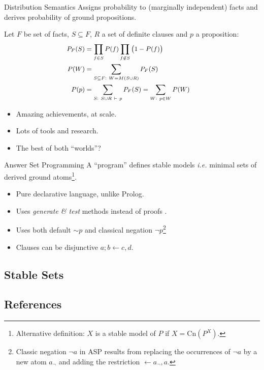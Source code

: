 \documentclass[bigger]{beamer}
\begin{document}
    \begin{frame}{Distribution Semantics}
        Assigns probability to (marginally independent) facts and derives probability of ground propositions.

        Let $F$ be set of facts, $S\subseteq F$, $R$ a set of definite clauses and $p$ a proposition:
        $$\small
        \begin{aligned}
            P_F(S) &= \prod_{f \in S} P(f) \prod_{f \not\in S} \left(1 - P(f) \right) \cr
            P(W) &= \sum_{S \subseteq F :~W=M(S\cup R)} P_F(S) \cr
            P(p) &= \sum_{S :~ S\cup R ~\vdash~ p} P_F(S) = \sum_{W :~ p\in W} P(W)
        \end{aligned}
        $$
        \begin{itemize}
            \item Amazing achievements, at scale.
            \item Lots of tools and research.
            \item The best of both ``worlds''?
        \end{itemize}
        
    \end{frame}

    \begin{frame}{Answer Set Programming}
        A ``program'' defines stable models \emph{i.e.} minimal sets of derived ground atoms\footnote{Alternative  definition: $X$ is a stable model of $P$ if $X = \text{Cn}(P^X)$.}.  
        \begin{itemize}
            \item Pure declarative language, unlike Prolog.
            \item Uses \emph{generate \& test} methods instead of proofs .
            \item Uses both default $\sim\!p$ and classical negation $\neg p$\footnote{Classic negation $\neg a$ in ASP results from replacing the occurrences of $\neg a$ by a new atom $a_\neg$ and adding the restriction $\leftarrow a_\neg, a$.}
            \item Clauses can be disjunctive $a ; b \leftarrow c, d.$
        \end{itemize}
    \end{frame}

    \subsection*{Stable Sets}
    
    \begin{frame}
        \tableofcontents[currentsection]
    \end{frame}

    \subsection*{References}
    
    \begin{frame}
        \tableofcontents[currentsection]
    \end{frame}
\end{document}
